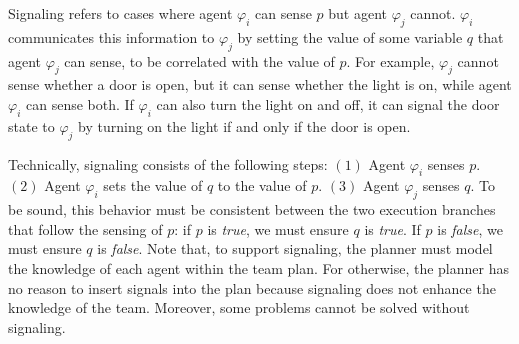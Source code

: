 \documentclass[letterpaper]{article} %
\theoremstyle{definition}
\begin{document}
Signaling refers to cases where agent $\varphi_i$ can sense $p$ but agent $\varphi_j$ cannot.
$\varphi_i$  communicates this information to $\varphi_j$ by setting the value of some variable $q$ that agent $\varphi_j$ can sense, to be correlated with the value of $p$. For example,  $\varphi_j$ cannot sense whether a door is open, but it can sense whether the light is on, while agent $\varphi_i$ can sense both. If $\varphi_i$ can also turn the light on and off, it can signal the door state to $\varphi_j$ by turning on the light if and only if the door is open. 



Technically, signaling consists of the following steps: $(1)$ Agent $\varphi_i$ senses $p$. $(2)$ Agent $\varphi_i$ sets the value of $q$ to the value of $p$. $(3)$ Agent $\varphi_j$ senses $q$. 
To be sound, this behavior must be consistent between the two execution branches that follow the sensing of $p$: if $p$ is \emph{true}, we must ensure $q$ is \emph{true}. 
If $p$ is \emph{false}, we must ensure $q$ is \emph{false}. 
%
Note that, to support signaling, the planner must model the knowledge of each agent within the team plan. For otherwise, the planner has no reason to insert signals into the plan because signaling does not enhance the knowledge of the team. Moreover, some problems cannot be solved without signaling.




\end{document}
